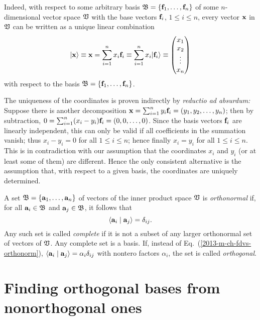 Indeed, with respect to some arbitrary  basis ${\frak B}=\{
{\bf f}_1, \ldots , {\bf f}_n\}$ of some $n$-dimensional vector space ${\frak V}$
with the base vectors ${\bf f}_i$, $1\le i\le n$, every vector ${\bf x}$ in  ${\frak V}$
can be written as a unique linear combination
\begin{equation}
 \vert {\bf x} \rangle \equiv {\bf x} = \sum_{i=1}^n x_i{\bf f}_i
\equiv
\sum_{i=1}^n x_i \vert {\bf f}_i \rangle
\equiv \begin{pmatrix} x_1\\x_2\\ \vdots \\ x_n \end{pmatrix}
\end{equation}
with respect to the basis  ${\frak B}=\{
{\bf f}_1, \ldots , {\bf f}_n\}$.

{\color{OliveGreen}
\bproof
The uniqueness of the coordinates is proven indirectly by {\em reductio ad absurdum:}
Suppose there is another decomposition
${\bf x} = \sum_{i=1}^n y_i{\bf f}_i = (y_1,y_2, \ldots , y_n) $;
then by subtraction, $0 = \sum_{i=1}^n (x_i-y_i) {\bf f}_i = (0,0, \ldots , 0)$.
Since the basis vectors ${\bf f}_i$ are linearly independent,
this can only be valid if all coefficients in the summation  vanish;
thus $x_i-y_i=0$ for all $1\le i\le n$; hence finally  $x_i=y_i$ for all $1\le i\le n$.
This is in contradiction with our assumption that the coordinates $x_i$ and $y_i$
(or at least some of them) are different.
Hence the only consistent alternative is the assumption that, with respect to a given basis, the coordinates are uniquely determined.
\eproof
}

A  set    ${\frak B} = \{ {\bf a}_1, \ldots , {\bf a}_n\}$
of  vectors   of the inner product space $\frak V$
is {\em orthonormal}
if, for all
 ${\bf a}_i\in\frak B$ and
 ${\bf a}_j\in\frak B$,
it follows that
\begin{equation}
\langle {\bf a}_i \mid {\bf a}_j \rangle =\delta_{ij}.
\label{2013-m-ch-fdvs-orthonorm}
\end{equation}
Any such set is called {\em complete}
if it is not a subset of any larger orthonormal set of vectors of $\frak V$.
Any complete set is a basis.
If, instead of Eq.~(\ref{2013-m-ch-fdvs-orthonorm}),
$\langle {\bf a}_i \mid {\bf a}_j \rangle = \alpha_i \delta_{ij}$
with nontero factors $\alpha_i$, the set is called {\em orthogonal}.


\section{Finding orthogonal bases from nonorthogonal ones}

